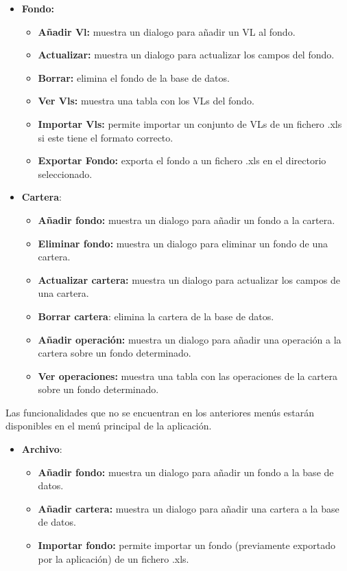 \documentclass[12pt, a4paper]{book}
\begin{document}
\begin{itemize}
	\item \textbf{Fondo:}
	\begin{itemize}
		\item \textbf{Añadir Vl:} muestra un dialogo para añadir un \gls{VL} al fondo.
		\item \textbf{Actualizar:} muestra un dialogo para actualizar los campos del fondo.
		\item \textbf{Borrar:} elimina el fondo de la base de datos.
		\item \textbf{Ver Vls:} muestra una tabla con los \gls{VL}s del fondo.
		\item \textbf{Importar Vls:} permite importar un conjunto de \gls{VL}s de un fichero .xls si este tiene el formato correcto.
		\item \textbf{Exportar Fondo:} exporta el fondo a un fichero .xls en el directorio seleccionado.
	\end{itemize}
\end{itemize}
\newpage
\begin{itemize}
	\item \textbf{Cartera}:
	\begin{itemize}
		\item\textbf{Añadir fondo:} muestra un dialogo para añadir un fondo a la cartera.
		\item \textbf{Eliminar fondo:} muestra un dialogo para eliminar un fondo de una cartera.
		\item \textbf{Actualizar cartera:} muestra un dialogo para actualizar los campos de una cartera.
		\item \textbf{Borrar cartera}: elimina la cartera de la base de datos.
		\item \textbf{Añadir operación:} muestra un dialogo para añadir una operación a la cartera sobre un fondo determinado.
		\item \textbf{Ver operaciones:} muestra una tabla con las operaciones de la cartera sobre un fondo determinado.\\
	\end{itemize}
\end{itemize}

Las funcionalidades que no se encuentran en los anteriores menús estarán disponibles en el menú principal de la aplicación.

\begin{itemize}
	\item \textbf{Archivo}:
	\begin{itemize}
		\item\textbf{Añadir fondo:} muestra un dialogo para añadir un fondo a la base de datos.
		\item \textbf{Añadir cartera:} muestra un dialogo para añadir una cartera a la base de datos.
		\item \textbf{Importar fondo:} permite importar un fondo (previamente exportado por la aplicación) de un fichero .xls.\\
	\end{itemize}
\end{itemize}
\end{document}
